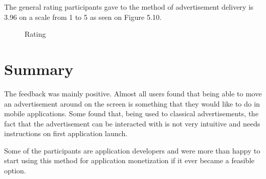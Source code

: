The general rating participants gave to the method of advertisement delivery is 3.96 on a scale from 1 to 5 as seen on Figure 5.10.

\begin{figure}
\begin{center}
\caption{Rating}
\end{center}
\end{figure}

\section{Summary}

The feedback was mainly positive. Almost all users found that being able to move an advertisement around on the screen is something that they would like to do in mobile applications. Some found that, being used to classical advertisements, the fact that the advertisement can be interacted with is not very intuitive and needs instructions on first application launch.

Some of the participants are application developers and were more than happy to start using this method for application monetization if it ever became a feasible option.

